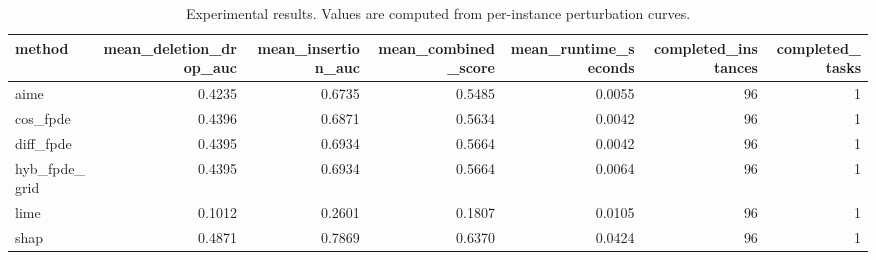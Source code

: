 \begin{table}[t]
\caption{Experimental results. Values are computed from per-instance perturbation curves.}
\label{tab:main_results_computed}
\centering
\begin{tabular}{lrrrrrr}
\toprule
method & mean\_deletion\_drop\_auc & mean\_insertion\_auc & mean\_combined\_score & mean\_runtime\_seconds & completed\_instances & completed\_tasks \\
\midrule
aime & 0.4235 & 0.6735 & 0.5485 & 0.0055 & 96 & 1 \\
cos\_fpde & 0.4396 & 0.6871 & 0.5634 & 0.0042 & 96 & 1 \\
diff\_fpde & 0.4395 & 0.6934 & 0.5664 & 0.0042 & 96 & 1 \\
hyb\_fpde\_grid & 0.4395 & 0.6934 & 0.5664 & 0.0064 & 96 & 1 \\
lime & 0.1012 & 0.2601 & 0.1807 & 0.0105 & 96 & 1 \\
shap & 0.4871 & 0.7869 & 0.6370 & 0.0424 & 96 & 1 \\
\bottomrule
\end{tabular}

\end{table}
